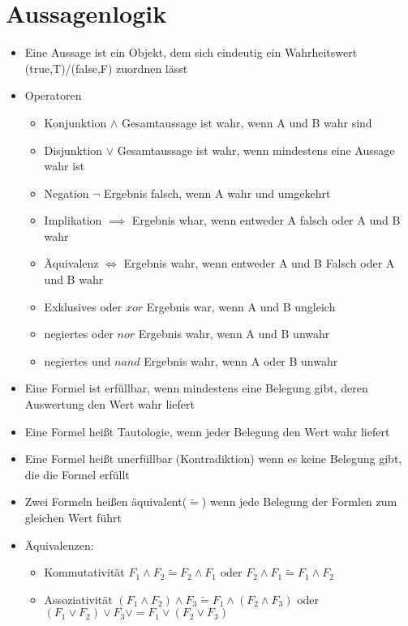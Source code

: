 \documentclass[10pt,a5paper]{article}
\begin{document}
\section{Aussagenlogik}
\begin{itemize}
\item Eine Aussage ist ein Objekt, dem sich eindeutig ein Wahrheitswert (true,T)/(false,F) zuordnen lässt
\item Operatoren\begin{itemize}
\item Konjunktion \ensuremath{\land}
\subitem Gesamtaussage ist wahr, wenn A und B wahr sind
\item Disjunktion \ensuremath{\lor}
\subitem Gesamtaussage ist wahr, wenn mindestens eine Aussage wahr ist
\item Negation \ensuremath{\lnot}
\subitem Ergebnis falsch, wenn A wahr und umgekehrt
\item Implikation \ensuremath{\implies}
\subitem Ergebnis whar, wenn entweder A falsch oder A und B wahr
\item Äquivalenz \ensuremath{\iff}
\subitem Ergebnis wahr, wenn entweder A und B Falsch oder A und B wahr
\item Exklusives oder \ensuremath{xor}
\subitem Ergebnis war, wenn A und B ungleich
\item negiertes oder \ensuremath{nor}
\subitem Ergebnis wahr, wenn A und B unwahr
\item negiertes und \ensuremath{nand}
\subitem Ergebnis wahr, wenn A oder B unwahr
\end{itemize}
\item Eine Formel ist erfüllbar, wenn mindestens eine Belegung gibt, deren Auswertung den Wert wahr liefert
\item Eine Formel heißt Tautologie, wenn jeder Belegung den Wert wahr liefert
\item Eine Formel heißt unerfüllbar (Kontradiktion) wenn es keine Belegung gibt, die die Formel erfüllt
\item Zwei Formeln heißen äquivalent(\ensuremath{\tilde{=}}) wenn jede Belegung der Formlen zum gleichen Wert führt
\item Äquivalenzen:\begin{itemize}
\item Kommutativität
\subitem \ensuremath{F_1\land F_2\tilde{=}F_2\land F_1} oder \ensuremath{F_2\land F_1\tilde{=}F_1\land F_2}
\item Assoziativität
\subitem \ensuremath{(F_1\land F_2)\land F_3 \tilde{=}F_1\land (F_2\land F_3)} oder \ensuremath{(F_1\lor F_2)\lor F_3 \lor{=}F_1\lor (F_2\lor F_3)}

\end{itemize}
\end{itemize}
\end{document}
